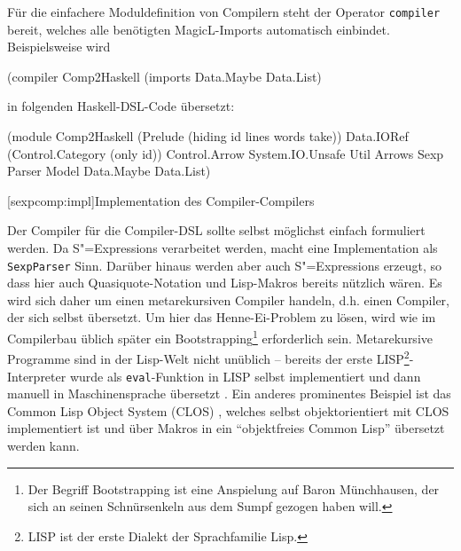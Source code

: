 \documentclass[12pt, a4paper, bibgerm]{scrbook}
\newenvironment{DIFnomarkup}{}{}
\newcommand\icode[1]{\lstinline?#1?}
\newcommand\lsection{}
\newcommand{\sexps}{S"=Expressions}
\begin{document}
Für die einfachere Moduldefinition von Compilern steht der Operator
\icode{compiler} bereit, welches alle benötigten MagicL-Imports
automatisch einbindet. Beispielsweise wird
\begin{DIFnomarkup}\begin{code}
(compiler Comp2Haskell (imports Data.Maybe Data.List)  
\end{code}\end{DIFnomarkup}
in folgenden Haskell-DSL-Code übersetzt:
\begin{DIFnomarkup}\begin{code}
(module
  Comp2Haskell
  (Prelude (hiding id lines words take))
  Data.IORef
  (Control.Category (only id))
  Control.Arrow
  System.IO.Unsafe
  Util
  Arrows
  Sexp
  Parser
  Model
  Data.Maybe
  Data.List)
\end{code}\end{DIFnomarkup}

\lsection[sexpcomp:impl]{Implementation des Compiler-Compilers}

Der Compiler für die Compiler-DSL sollte selbst möglichst einfach
formuliert werden. Da \sexps{} verarbeitet werden, macht eine
Implementation als \icode{SexpParser} Sinn. Darüber hinaus werden aber
auch \sexps{} erzeugt, so dass hier auch Quasiquote-Notation und
Lisp-Makros bereits nützlich wären. Es wird sich daher um einen
metarekursiven Compiler handeln, d.h. einen Compiler, der sich selbst
übersetzt. Um hier das Henne-Ei-Problem zu lösen, wird wie im
Compilerbau üblich später ein Bootstrapping\footnote{Der Begriff
  Bootstrapping ist eine Anspielung auf Baron Münchhausen, der sich an
  seinen Schnürsenkeln aus dem Sumpf gezogen haben will.} erforderlich
sein. Metarekursive Programme sind in der Lisp-Welt nicht unüblich --
bereits der erste LISP\footnote{LISP ist der erste Dialekt der
  Sprachfamilie Lisp.}-Interpreter wurde als \icode{eval}-Funktion in
LISP selbst implementiert und dann manuell in Maschinensprache übersetzt
\cite{LispHistory}. Ein anderes prominentes Beispiel ist das Common Lisp
Object System (CLOS) \cite{MetaobjectProtocol}, welches selbst
objektorientiert mit CLOS implementiert ist und über Makros in ein
``objektfreies Common Lisp'' übersetzt werden kann.
\end{document}
